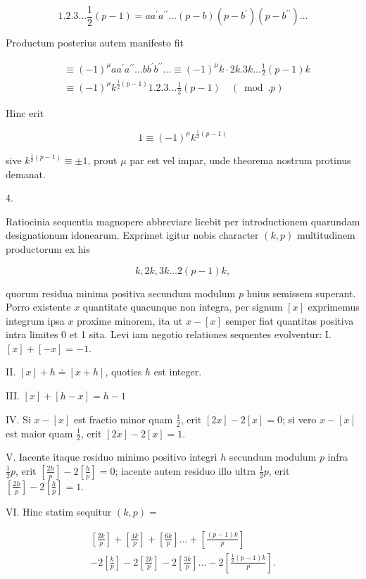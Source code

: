 \documentclass[10pt]{article}
\begin{document}
\[
1.2 .3 \ldots \frac{1}{2}(p-1)=a a^{\prime} a^{\prime \prime} \ldots(p-b)\left(p-b^{\prime}\right)\left(p-b^{\prime \prime}\right) \ldots
\]

Productum posterius autem manifesto fit

\[
\begin{aligned}
& \equiv(-1)^{\mu} a a^{\prime} a^{\prime \prime} \ldots b b^{\prime} b^{\prime \prime} \ldots \equiv(-1)^{\mu} k \cdot 2 k .3 k \ldots \frac{1}{2}(p-1) k \\
& \equiv(-1)^{\mu} k^{\frac{1}{2}(p-1)} 1.2 .3 \ldots \frac{1}{2}(p-1) \quad(\bmod . p)
\end{aligned}
\]

Hinc erit

\[
1 \equiv(-1)^{\mu} k^{\frac{1}{2}(p-1)}
\]

sive \(k^{\frac{1}{2}(p-1)} \equiv \pm 1\), prout \(\mu\) par est vel impar, unde theorema nostrum protinus demanat.

4.

Ratiocinia sequentia magnopere abbreviare licebit per introductionem quarundam designationum idonearum. Exprimet igitur nobis character \((k, p)\) multitudinem productorum ex his

\[
k, 2 k, 3 k \ldots 2(p-1) k,
\]

quorum residua minima positiva secundum modulum \(p\) huius semissem superant. Porro existente \(x\) quantitate quacunque non integra, per signum \([x]\) exprimemus integrum ipsa \(x\) proxime minorem, ita ut \(x-[x]\) semper fiat quantitas positiva intra limites 0 et 1 sita. Levi iam negotio relationes sequentes evolventur:
I. \([x]+[-x]=-1\).

II. \([x]+h \doteq[x+h]\), quoties \(h\) est integer.

III. \([x]+[h-x]=h-1\)

IV. Si \(x-[x]\) est fractio minor quam \(\frac{1}{2}\), erit \([2 x]-2[x]=0\); si vero \(x-[x]\) est maior quam \(\frac{1}{2}\), erit \([2 x]-2[x]=1\).

V. Iacente itaque residuo minimo positivo integri \(h\) secundum modulum \(p\) infra \(\frac{1}{2} p\), erit \(\left[\frac{2 h}{p}\right]-2\left[\frac{h}{p}\right]=0\); iacente autem residuo illo ultra \(\frac{1}{2} p\), erit \(\left[\frac{2 h}{p}\right]-2\left[\frac{h}{p}\right]=1\).

VI. Hinc statim sequitur \((k, p)=\)

\[
\begin{gathered}
{\left[\frac{2 k}{p}\right]+\left[\frac{4 k}{p}\right]+\left[\frac{6 k}{p}\right] \ldots+\left[\frac{(p-1) k}{p}\right]} \\
-2\left[\frac{k}{p}\right]-2\left[\frac{2 k}{p}\right]-2\left[\frac{3 k}{p}\right] \ldots-2\left[\frac{\frac{1}{2}(p-1) k}{p}\right] .
\end{gathered}
\]
\end{document}
